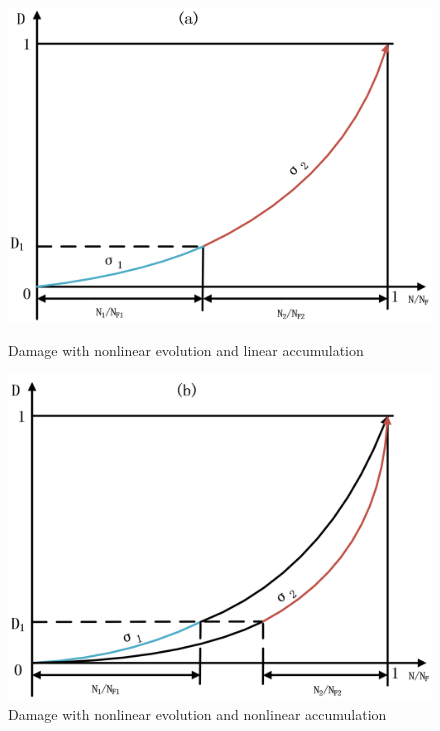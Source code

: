 \documentclass[3p,times,procedia,number]{elsarticle}
\begin{document}
\begin{figure}[h!]
	\begin{minipage}[t]{0.5\textwidth}
		\includegraphics[width=\textwidth]{figures//linearaccumulation.png} 
		\caption{Damage with nonlinear evolution and linear accumulation}
		\label{linear accumulation}
	\end{minipage}
	\begin{minipage}[t]{0.5\textwidth}
		\includegraphics[width=\textwidth]{figures//nonlinearaccumulation.png} 
		\caption{Damage with nonlinear evolution and nonlinear accumulation}
		\label{nonlinear accumulation}
	\end{minipage}
\end{figure} 
\end{document}

